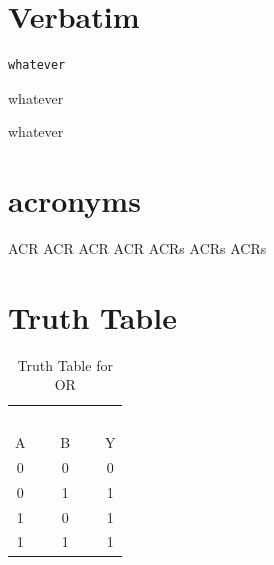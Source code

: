 \section{Verbatim}
\begin{Verbatim}[commandchars=~\[\], samepage=true]
whatever
\end{Verbatim}

\begin{binDisp} %
whatever
\end{binDisp}

\begin{lineDisp} %
whatever
\end{lineDisp}



\section{acronyms}
\ac{ACR}   %
\acl{ACR}  %
\acf{ACR}  %
\acs{ACR}  %
\acp{ACR}  %
\acfp{ACR} %
\aclp{ACR} %

\section{Truth Table}
\begin{table}[H]
	\sffamily
	\newcommand{\head}[1]{\textcolor{white}{\textbf{#1}}}		
	\begin{center}
		\begin{tabular}{ccc} 
			\rowcolor{black!75}
			\multicolumn{2}{c}{\head{Inputs}} & \head{Output} \\
			A & B & Y \\
			\hline
			0 & 0 & 0 \\
			0 & 1 & 1 \\
			1 & 0 & 1 \\
			1 & 1 & 1 
		\end{tabular}
	\end{center}
	\caption{Truth Table for OR}
	\label{03:tab:truth_table_for_or}
\end{table}


